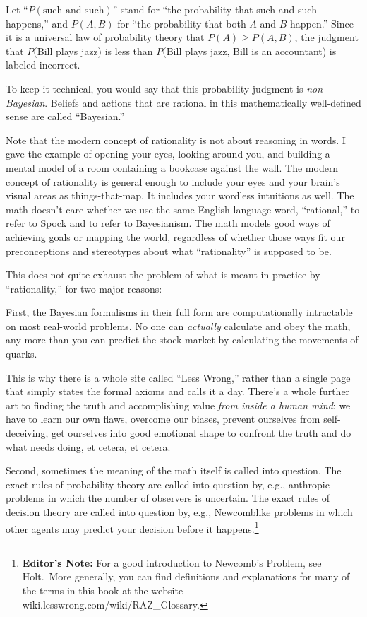 {
 Let ``$P(\text{such-and-such})$'' stand
for ``the probability that such-and-such
happens,'' and $P(A,B)$ for ``the
probability that both $A$ and $B$ happen.'' Since it is a
universal law of probability theory that $P(A) \geq P(A,B)$, the
judgment that $P$(Bill plays jazz) is less than $P$(Bill plays jazz, Bill
is an accountant) is labeled incorrect.}

{
 To keep it technical, you would say that this probability judgment
is \textit{non-Bayesian}. Beliefs and actions that are rational in this
mathematically well-defined sense are called
``Bayesian.''}

{
 Note that the modern concept of rationality is not about reasoning
in words. I gave the example of opening your eyes, looking around you,
and building a mental model of a room containing a bookcase against the
wall. The modern concept of rationality is general enough to include
your eyes and your brain's visual areas as
things-that-map. It includes your wordless intuitions as well. The math
doesn't care whether we use the same English-language
word, ``rational,'' to refer to
Spock and to refer to Bayesianism. The math models good ways of
achieving goals or mapping the world, regardless of whether those ways
fit our preconceptions and stereotypes about what
``rationality'' is supposed to be.}

{
 This does not quite exhaust the problem of what is meant in
practice by ``rationality,'' for two
major reasons:}

{
 First, the Bayesian formalisms in their full form are
computationally intractable on most real-world problems. No one can
\textit{actually} calculate and obey the math, any more than you can
predict the stock market by calculating the movements of quarks.}

{
 This is why there is a whole site called ``Less
Wrong,'' rather than a single page that simply states
the formal axioms and calls it a day. There's a whole
further art to finding the truth and accomplishing value \textit{from
inside a human mind}: we have to learn our own flaws, overcome our
biases, prevent ourselves from self-deceiving, get ourselves into good
emotional shape to confront the truth and do what needs doing, et
cetera, et cetera.}

{
 Second, sometimes the meaning of the math itself is called into
question. The exact rules of probability theory are called into
question by, e.g., anthropic problems in which the number of observers
is uncertain. The exact rules of decision theory are called into
question by, e.g., Newcomblike problems in which other agents may
predict your decision before it happens.\footnote{\textbf{Editor's Note:} For a good introduction
to Newcomb's Problem, see Holt.\footnotemark \  More
generally, you can find definitions and explanations for many of the
terms in this book at the website
wiki.lesswrong.com/wiki/RAZ\_Glossary.}}


